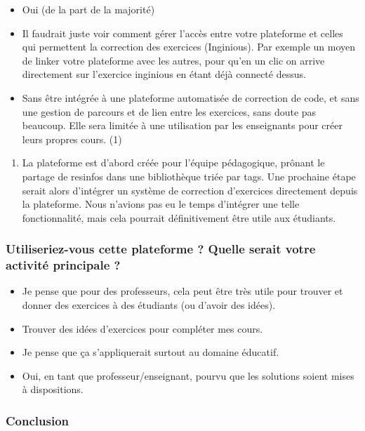 \begin{itemize}
    \item Oui (de la part de la majorité)
    \item Il faudrait juste voir comment gérer l'accès entre votre plateforme et celles qui permettent la correction des exercices (Inginious). Par exemple un moyen de linker votre plateforme avec les autres, pour qu'en un clic on arrive directement sur l'exercice inginious en étant déjà connecté dessus.
    \item Sans être intégrée à une plateforme automatisée de correction de code, et sans une gestion de parcours et de lien entre les exercices, sans doute pas beaucoup. Elle sera limitée à une utilisation par les enseignants pour créer leurs propres cours. (1)
\end{itemize}
\bigskip
\begin{enumerate}
    \item La plateforme est d'abord créée pour l'équipe pédagogique, prônant le partage de \glspl{resinfo} dans une bibliothèque triée par \glspl{tag}. Une prochaine étape serait alors d'intégrer un système de correction d'exercices directement depuis la plateforme. Nous n'avions pas eu le temps d'intégrer une telle fonctionnalité, mais cela pourrait définitivement être utile aux étudiants.
\end{enumerate}

\subsubsection*{Utiliseriez-vous cette plateforme ? Quelle serait votre activité principale ?}

\begin{itemize}
    \item Je pense que pour des professeurs, cela peut être très utile pour trouver et donner des exercices à des étudiants (ou d'avoir des idées).
    \item Trouver des idées d'exercices pour compléter mes cours.
    \item Je pense que ça s'appliquerait surtout au domaine éducatif.
    \item Oui, en tant que professeur/enseignant, pourvu que les solutions soient mises à dispositions.
\end{itemize}

\subsubsection*{Conclusion}

